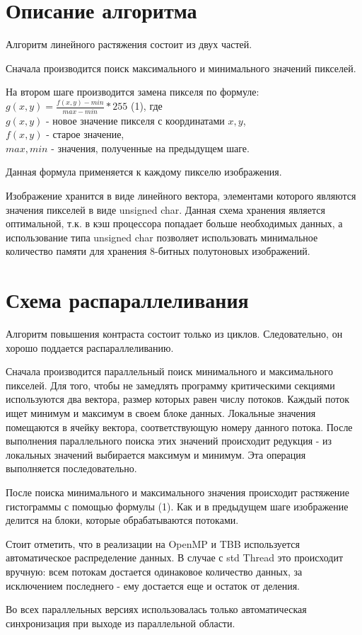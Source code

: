 \documentclass{report}
\begin{document}
    \newpage
    \section*{Описание алгоритма}
    \par Алгоритм линейного растяжения состоит из двух частей. 
    \par Сначала производится поиск максимального и минимального значений пикселей.
    \par На втором шаге производится замена пикселя по формуле: \\
    $g(x, y) = \frac{f(x,y)-min}{max - min} * 255$ (1), где \\$g(x, y)$ - новое значение пикселя с координатами $x, y$, \\$f(x, y)$ - старое значение, \\$max, min$ - значения, полученные на предыдущем шаге.
    \par Данная формула применяется к каждому пикселю изображения.
    \par Изображение хранится в виде линейного вектора, элементами которого являются значения пикселей в виде unsigned char. Данная схема хранения является оптимальной, т.к. в кэш процессора попадает больше необходимых данных, а использование типа unsigned char позволяет использовать минимальное количество памяти для хранения 8-битных полутоновых изображений. 
    
    \newpage
    \section*{Схема распараллеливания}
    \par Алгоритм повышения контраста состоит только из циклов. Следовательно, он хорошо поддается распараллеливанию.
    \par Сначала производится параллельный поиск минимального и максимального пикселей. Для того, чтобы не замедлять программу критическими секциями используются два вектора, размер которых равен числу потоков. Каждый поток ищет минимум и максимум в своем блоке данных. Локальные значения помещаются в ячейку вектора, соответствующую номеру данного потока. После выполнения параллельного поиска этих значений происходит редукция - из локальных значений выбирается максимум и минимум. Эта операция выполняется последовательно.
    \par После поиска минимального и максимального значения происходит растяжение гистограммы с помощью формулы (1). Как и в предыдущем шаге изображение делится на блоки, которые обрабатываются потоками.
    \par Стоит отметить, что в реализации на OpenMP и TBB используется автоматическое распределение данных. В случае с std Thread это происходит вручную: всем потокам достается одинаковое количество данных, за исключением последнего - ему достается еще и остаток от деления.
    \par Во всех параллельных версиях использовалась только автоматическая синхронизация при выходе из параллельной области.
    
\end{document}
